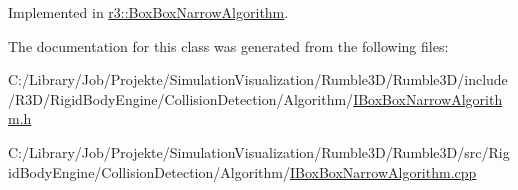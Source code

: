 Implemented in \mbox{\hyperlink{classr3_1_1_box_box_narrow_algorithm_a200098ad4e6e2381f58856002a2d5dec}{r3\+::\+Box\+Box\+Narrow\+Algorithm}}.



The documentation for this class was generated from the following files\+:\begin{DoxyCompactItemize}
\item 
C\+:/\+Library/\+Job/\+Projekte/\+Simulation\+Visualization/\+Rumble3\+D/\+Rumble3\+D/include/\+R3\+D/\+Rigid\+Body\+Engine/\+Collision\+Detection/\+Algorithm/\mbox{\hyperlink{_i_box_box_narrow_algorithm_8h}{I\+Box\+Box\+Narrow\+Algorithm.\+h}}\item 
C\+:/\+Library/\+Job/\+Projekte/\+Simulation\+Visualization/\+Rumble3\+D/\+Rumble3\+D/src/\+Rigid\+Body\+Engine/\+Collision\+Detection/\+Algorithm/\mbox{\hyperlink{_i_box_box_narrow_algorithm_8cpp}{I\+Box\+Box\+Narrow\+Algorithm.\+cpp}}\end{DoxyCompactItemize}
